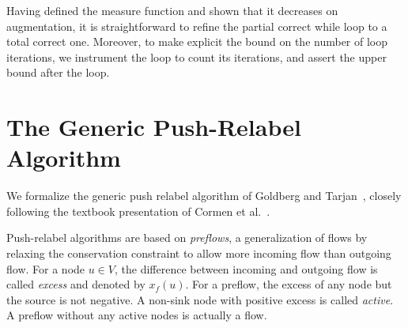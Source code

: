 \documentclass[smallcondensed]{svjour3}     %
\begin{document}
%   
%   
%   
  
  Having defined the measure function and shown that it decreases on augmentation, it is straightforward to refine the partial correct while loop to a total correct one. Moreover, to make explicit the bound on the number of loop iterations, we instrument the loop to count its iterations, and assert the upper bound after the loop.


\section{The Generic Push-Relabel Algorithm}\label{sec:gen-prpu}
  We formalize the generic push relabel algorithm of Goldberg and Tarjan~\cite{GoTa88},
  closely following the textbook presentation of Cormen et al.~\cite{CLRS09}.
  
  Push-relabel algorithms are based on \emph{preflows}, a generalization of flows
  by relaxing the conservation constraint to allow more incoming flow than outgoing flow.
  For a node $u\in V$, the difference between incoming and outgoing flow is called \emph{excess} and denoted by $x_f(u)$.
  For a preflow, the excess of any node but the source is not negative.
  A non-sink node with positive excess is called \emph{active}. A preflow without any active nodes is actually a flow.
  
\end{document}
